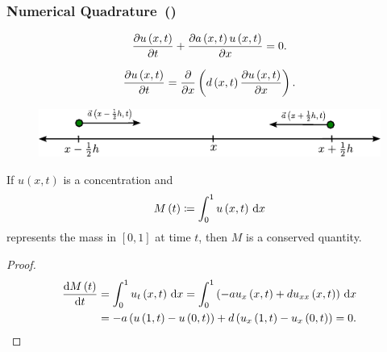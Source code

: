 \begin{frame}
    \frametitle{Numerical Quadrature~(\citeauthor[p.~9]{Hundsdorfer2003})}

    \begin{definition}
        \begin{equation*}
            \diffp{u\left(x,t\right)}{t}+
            \diffp{a\left(x,t\right)u\left(x,t\right)}{x}=
            0.
        \end{equation*}
    \end{definition}

    \begin{definition}
        \begin{equation*}
            \diffp{u\left(x,t\right)}{t}=
            \diffp{}{x}
            \left(
            d\left(x,t\right)\diffp{u\left(x,t\right)}{x}
            \right).
        \end{equation*}
    \end{definition}

    \begin{figure}[ht!]
        \centering
        \includegraphics[width=.6\paperwidth]{deduction}
    \end{figure}
\end{frame}

\begin{frame}

    \begin{theorem}
        If $u\left(x,t\right)$ is a concentration and
        \begin{equation*}
            M\left(t\right)\coloneqq
            \int_{0}^{1}
            u\left(x,t\right)
            \dl x
        \end{equation*}
        represents the mass in $\left[0,1\right]$ at time $t$, then
        $M$ is a conserved quantity.
    \end{theorem}

    \begin{proof}
        \begin{align*}
            \diff{M\left(t\right)}{t} & =
            \int_{0}^{1}
            u_{t}\left(x,t\right)
            \dl x=
            \int_{0}^{1}
            \left(
            -au_{x}\left(x,t\right)+
            du_{xx}\left(x,t\right)
            \right)\dl x                  \\
                                      & =
            -a\left(
            u\left(1,t\right)-
            u\left(0,t\right)
            \right)+
            d\left(
            u_{x}\left(1,t\right)-
            u_{x}\left(0,t\right)
            \right)=0.
        \end{align*}
    \end{proof}
\end{frame}

